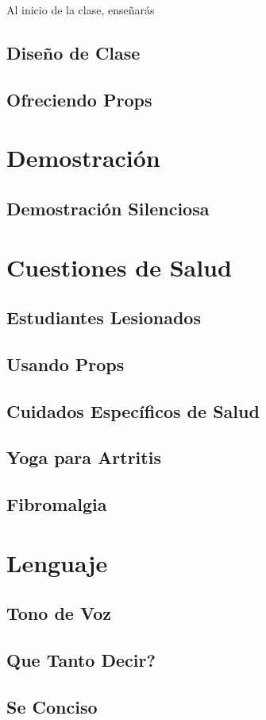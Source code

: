 Al inicio de la clase, enseñarás

\subsection{Diseño de Clase}
\subsection{Ofreciendo Props}
\section{Demostración}
\subsection{Demostración Silenciosa}
\section{Cuestiones de Salud}
\subsection{Estudiantes Lesionados}
\subsection{Usando Props}
\subsection{Cuidados Específicos de Salud}
\subsection{Yoga para Artritis}
\subsection{Fibromalgia}
\section{Lenguaje}
\subsection{Tono de Voz}
\subsection{Que Tanto Decir?}
\subsection{Se Conciso}
